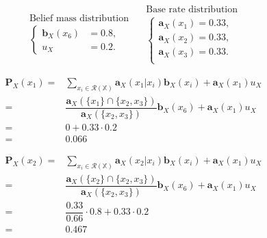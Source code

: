 \begin{equation}
    \begin{array}{l}
        \text{Belief mass distribution} \\
        \left\{\begin{array}{ll}
            \mathbf{b}_X(x_6) & = 0.8 \text{,} \\
            u_X               & = 0.2 \text{.}
        \end{array}\right.
    \end{array} \quad
    \begin{array}{l}
        \text{Base rate distribution} \\
        \left\{\begin{array}{l}
            \mathbf{a}_X(x_1) = 0.33 \text{,} \\
            \mathbf{a}_X(x_2) = 0.33 \text{,} \\
            \mathbf{a}_X(x_3) = 0.33 \text{.} \\
        \end{array}\right.
    \end{array}
\end{equation}

\def\arraystretch{1.5}
\begin{equation*}
    \begin{array}{rl}
         \mathbf{P}_X(x_1) = & \sum\limits_{x_i \in \mathcal{R}(\mathbb{X})} \mathbf{a}_X(x_1 | x_i) \mathbf{b}_X(x_i) + \mathbf{a}_X(x_1) u_X \\
                           = & \dfrac{\mathbf{a}_X(\{x_1\} \cap \{x_2, x_3\})}{\mathbf{a}_X(\{x_2, x_3\})} \mathbf{b}_X(x_6) + \mathbf{a}_X(x_1) u_X \\
                           = & 0 + 0.33 \cdot 0.2 \\
                           = & 0.066
    \end{array}
\end{equation*}

\begin{equation*}
    \begin{array}{rl}
        \mathbf{P}_X(x_2) = & \sum\limits_{x_i \in \mathcal{R}(\mathbb{X})} \mathbf{a}_X(x_2 | x_i) \mathbf{b}_X(x_i) + \mathbf{a}_X(x_1) u_X \\
                          = & \dfrac{\mathbf{a}_X(\{x_2\} \cap \{x_2, x_3\})}{\mathbf{a}_X(\{x_2, x_3\})} \mathbf{b}_X(x_6) + \mathbf{a}_X(x_1) u_X \\
                          = & \dfrac{0.33}{0.66} \cdot 0.8 + 0.33 \cdot 0.2 \\
                          = & 0.467
    \end{array}
\end{equation*}

